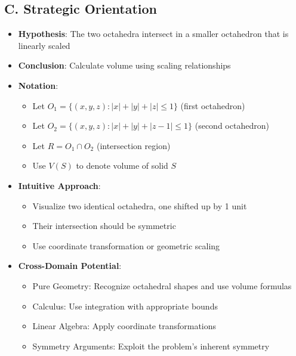 \documentclass[11pt]{article}
\begin{document}
\begin{problemconfigbox}
\subsection*{C. Strategic Orientation}
\begin{itemize}[leftmargin=*]
    \item \textbf{Hypothesis}: The two octahedra intersect in a smaller octahedron that is linearly scaled
    \item \textbf{Conclusion}: Calculate volume using scaling relationships
    \item \textbf{Notation}: 
    \begin{itemize}
        \item Let $O_1 = \{(x,y,z) : |x|+|y|+|z|\le1\}$ (first octahedron)
        \item Let $O_2 = \{(x,y,z) : |x|+|y|+|z-1|\le1\}$ (second octahedron)
        \item Let $R = O_1 \cap O_2$ (intersection region)
        \item Use $V(S)$ to denote volume of solid $S$
    \end{itemize}
    \item \textbf{Intuitive Approach}: 
    \begin{itemize}
        \item Visualize two identical octahedra, one shifted up by 1 unit
        \item Their intersection should be symmetric
        \item Use coordinate transformation or geometric scaling
    \end{itemize}
    \item \textbf{Cross-Domain Potential}: 
    \begin{itemize}
        \item Pure Geometry: Recognize octahedral shapes and use volume formulas
        \item Calculus: Use integration with appropriate bounds
        \item Linear Algebra: Apply coordinate transformations
        \item Symmetry Arguments: Exploit the problem's inherent symmetry
    \end{itemize}
\end{itemize}
\end{problemconfigbox}
\end{document}
